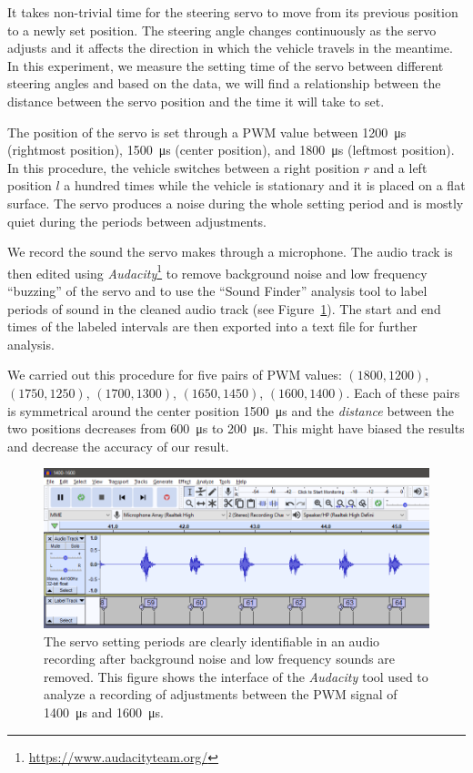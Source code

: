 It takes non-trivial time for the steering servo to move from its previous position to a newly set position. The steering angle changes continuously as the servo adjusts and it affects the direction in which the vehicle travels in the meantime. In this experiment, we measure the setting time of the servo between different steering angles and based on the data, we will find a relationship between the distance between the servo position and the time it will take to set.

The position of the servo is set through a \gls{PWM} value between \SI{1200}{\micro\second} (rightmost position), \SI{1500}{\micro\second} (center position), and \SI{1800}{\micro\second} (leftmost position). In this procedure, the vehicle switches between a right position $r$ and a left position $l$ a hundred times while the vehicle is stationary and it is placed on a flat surface. The servo produces a noise during the whole setting period and is mostly quiet during the periods between adjustments.

We record the sound the servo makes through a microphone. The audio track is then edited using \textit{Audacity}\footnote{\url{https://www.audacityteam.org/}} to remove background noise and low frequency ``buzzing'' of the servo and to use the ``Sound Finder'' analysis tool to label periods of sound in the cleaned audio track (see Figure~\ref{fig:audacity}). The start and end times of the labeled intervals are then exported into a text file for further analysis.

We carried out this procedure for five pairs of \gls*{PWM} values: $(1800, 1200)$, $(1750, 1250)$, $(1700, 1300)$, $(1650, 1450)$, $(1600, 1400)$. Each of these pairs is symmetrical around the center position \SI{1500}{\micro\second} and the \textit{distance} between the two positions decreases from \SI{600}{\micro\second} to \SI{200}{\micro\second}. This might have biased the results and decrease the accuracy of our result.

\begin{figure}[b]
	\includegraphics[width=\textwidth]{../img/servo_experiment_audacity}
	\protect\caption{The servo setting periods are clearly identifiable in an audio recording after background noise and low frequency sounds are removed. This figure shows the interface of the \textit{Audacity} tool used to analyze a recording of adjustments between the PWM signal of \SI{1400}{\micro\second} and \SI{1600}{\micro\second}.}
	\label{fig:audacity}
\end{figure}

